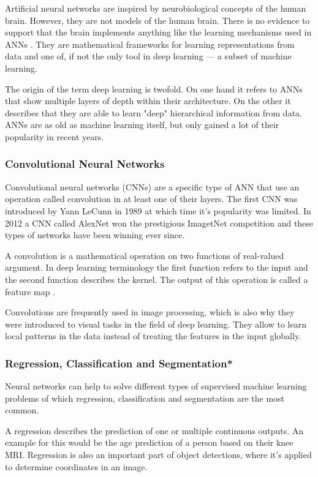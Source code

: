 Artificial neural networks are inspired by neurobiological concepts of the human brain. However, they are not models of the human brain. There is no evidence to support that the brain implements anything like the learning mechanisms used in ANNs \cite{Chollet2017}. They are mathematical frameworks for learning representations from data and one of, if not the only tool in deep learning --- a subset of machine learning.

The origin of the term deep learning is twofold. On one hand it refers to ANNs that show multiple layers of depth within their architecture. On the other it describes that they are able to learn "deep" hierarchical information from data. ANNs are as old as machine learning itself, but only gained a lot of their popularity in recent years.

\subsubsection{Convolutional Neural Networks}

Convolutional neural networks (CNNs) are a specific type of ANN that use an operation called convolution in at least one of their layers. The first CNN was introduced by Yann LeCunn \cite{LeCun1998} in 1989 at which time it's popularity was limited. In 2012 a CNN called AlexNet \cite{Krizhevsky} won the prestigious ImagetNet competition and these types of networks have been winning ever since.

A convolution is a mathematical operation on two functions of real-valued argument. In deep learning terminology the first function refers to the input and the second function describes the kernel. The output of this operation is called a feature map \cite{Goodfellow2016}.

Convolutions are frequently used in image processing, which is also why they were introduced to visual tasks in the field of deep learning. They allow to learn local patterns in the data instead of treating the features in the input globally.


\subsubsection{Regression, Classification and Segmentation*}

Neural networks can help to solve different types of supervised machine learning problems of which regression, classification and segmentation are the most common.

A regression describes the prediction of one or multiple continuous outputs. An example for this would be the age prediction of a person based on their knee MRI. Regression is also an important part of object detections, where it's applied to determine coordinates in an image.

